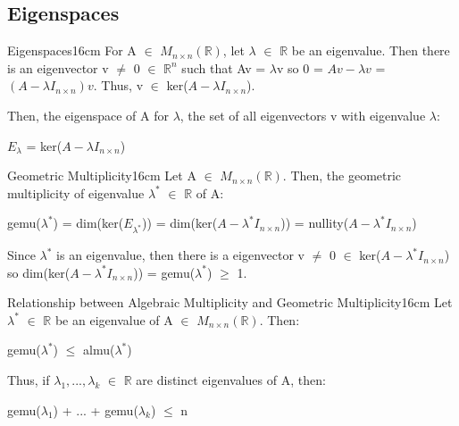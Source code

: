     \vspace{0.5cm}





\subsection{ Eigenspaces }

    \begin{definition}{Eigenspaces}{16cm}
        For A $\in$ $M_{n \times n}(\mathbb{R})$, let
        $\lambda$ $\in$ $\mathbb{R}$ be an eigenvalue.
        Then there is an eigenvector v $\not =$ 0 $\in$ $\mathbb{R}^n$
        such that Av = $\lambda$v so
        0 = $Av - \lambda v$ = $(A - \lambda I_{n \times n})v$.
        Thus, v $\in$ ker($A - \lambda I_{n \times n}$).

        Then, the {\color{lblue} eigenspace} of A for $\lambda$,
        the set of all eigenvectors v with eigenvalue $\lambda$:

        \hspace{0.5cm}
        $E_{\lambda}$ = ker($A - \lambda I_{n \times n}$)
    \end{definition}

    \vspace{0.5cm}



    \begin{definition}{Geometric Multiplicity}{16cm}
        Let A $\in$ $M_{n \times n}(\mathbb{R})$.
        Then, the {\color{lblue} geometric multiplicity}
        of eigenvalue $\lambda^*$ $\in$ $\mathbb{R}$ of A:
        
        \hspace{0.5cm}
        gemu($\lambda^*$)
        = dim(ker($E_{\lambda^*}$))
        = dim(ker($A - \lambda^* I_{n \times n}$))
        = nullity($A - \lambda^* I_{n \times n}$)

        Since $\lambda^*$ is an eigenvalue, then there is a eigenvector
        v $\not =$ 0 $\in$ ker($A - \lambda^* I_{n \times n}$)
        so dim(ker($A - \lambda^* I_{n \times n}$)) = gemu($\lambda^*$) $\geq$ 1.
    \end{definition}

    \vspace{0.5cm}



    \begin{wtheorem}{Relationship between Algebraic Multiplicity and
    Geometric Multiplicity}{16cm}
        Let $\lambda^*$ $\in$ $\mathbb{R}$ be an eigenvalue
        of A $\in$ $M_{n \times n}(\mathbb{R})$. Then:

        \hspace{0.5cm}
        gemu($\lambda^*$) $\leq$ almu($\lambda^*$)

        Thus, if $\lambda_1,...,\lambda_k$ $\in$ $\mathbb{R}$
        are distinct eigenvalues of A, then:

        \hspace{0.5cm}
        gemu($\lambda_1$) + ... + gemu($\lambda_k$) $\leq$ n
    \end{wtheorem}

